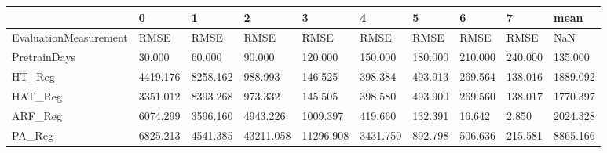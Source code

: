 \begin{tabular}{llllllllll}
\toprule
{} &        0 &        1 &         2 &         3 &        4 &       5 &       6 &       7 &     mean \\
\midrule
EvaluationMeasurement &     RMSE &     RMSE &      RMSE &      RMSE &     RMSE &    RMSE &    RMSE &    RMSE &      NaN \\
PretrainDays          &   30.000 &   60.000 &    90.000 &   120.000 &  150.000 & 180.000 & 210.000 & 240.000 &  135.000 \\
HT\_Reg                & 4419.176 & 8258.162 &   988.993 &   146.525 &  398.384 & 493.913 & 269.564 & 138.016 & 1889.092 \\
HAT\_Reg               & 3351.012 & 8393.268 &   973.332 &   145.505 &  398.580 & 493.900 & 269.560 & 138.017 & 1770.397 \\
ARF\_Reg               & 6074.299 & 3596.160 &  4943.226 &  1009.397 &  419.660 & 132.391 &  16.642 &   2.850 & 2024.328 \\
PA\_Reg                & 6825.213 & 4541.385 & 43211.058 & 11296.908 & 3431.750 & 892.798 & 506.636 & 215.581 & 8865.166 \\
\bottomrule
\end{tabular}
